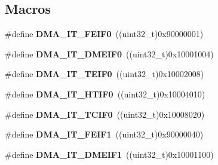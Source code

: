\subsection*{Macros}
\begin{DoxyCompactItemize}
\item 
\mbox{\label{group___d_m_a__interrupts__definitions_ga5202cf7ab467fe1a61c725d1f98f0689}} 
\#define {\bfseries D\+M\+A\+\_\+\+I\+T\+\_\+\+F\+E\+I\+F0}~((uint32\+\_\+t)0x90000001)
\item 
\mbox{\label{group___d_m_a__interrupts__definitions_ga8427aa66491c87a653f94f812b31cb17}} 
\#define {\bfseries D\+M\+A\+\_\+\+I\+T\+\_\+\+D\+M\+E\+I\+F0}~((uint32\+\_\+t)0x10001004)
\item 
\mbox{\label{group___d_m_a__interrupts__definitions_ga7f47bb08f22556f9a655adbce3d6982a}} 
\#define {\bfseries D\+M\+A\+\_\+\+I\+T\+\_\+\+T\+E\+I\+F0}~((uint32\+\_\+t)0x10002008)
\item 
\mbox{\label{group___d_m_a__interrupts__definitions_gaabb2f6093a51f4f25ac67a21125a8bc2}} 
\#define {\bfseries D\+M\+A\+\_\+\+I\+T\+\_\+\+H\+T\+I\+F0}~((uint32\+\_\+t)0x10004010)
\item 
\mbox{\label{group___d_m_a__interrupts__definitions_ga9de4a37c4fb35a2d3566d8060a8145be}} 
\#define {\bfseries D\+M\+A\+\_\+\+I\+T\+\_\+\+T\+C\+I\+F0}~((uint32\+\_\+t)0x10008020)
\item 
\mbox{\label{group___d_m_a__interrupts__definitions_gaa93c3fc1826e8bf9063ab64734277ca3}} 
\#define {\bfseries D\+M\+A\+\_\+\+I\+T\+\_\+\+F\+E\+I\+F1}~((uint32\+\_\+t)0x90000040)
\item 
\mbox{\label{group___d_m_a__interrupts__definitions_gabdbf66e3cbe14fe1f45c42635127e927}} 
\#define {\bfseries D\+M\+A\+\_\+\+I\+T\+\_\+\+D\+M\+E\+I\+F1}~((uint32\+\_\+t)0x10001100)
\item 
\mbox{\label{group___d_m_a__interrupts__definitions_gaeacbd5c206cc6026d3c03f8182b16aeb}} 

\end{DoxyCompactItemize}
